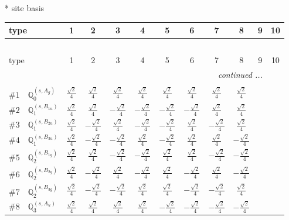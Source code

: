 \documentclass[fleqn,9pt,landscape]{jsarticle}
\begin{document}
* site basis
\begin{center}
\renewcommand{\arraystretch}{1.3}
\begin{longtable}{lcccccccccc}
 \hline \hline
type & 1 & 2 & 3 & 4 & 5 & 6 & 7 & 8 & 9 & 10 \\ \hline \endfirsthead

\multicolumn{10}{l}{\tablename\ \thetable{}} \\
 \hline \hline
type & 1 & 2 & 3 & 4 & 5 & 6 & 7 & 8 & 9 & 10 \\ \hline \endhead

 \hline \hline
\multicolumn{10}{r}{\footnotesize\it continued ...} \\ \endfoot

 \hline \hline
\multicolumn{10}{r}{} \\ \endlastfoot

$ \#1\quad \mathbb{Q}_{0}^{(s,A_{g})} $ & $ \frac{\sqrt{2}}{4} $ & $ \frac{\sqrt{2}}{4} $ & $ \frac{\sqrt{2}}{4} $ & $ \frac{\sqrt{2}}{4} $ & $ \frac{\sqrt{2}}{4} $ & $ \frac{\sqrt{2}}{4} $ & $ \frac{\sqrt{2}}{4} $ & $ \frac{\sqrt{2}}{4} $ \\ \hline
$ \#2\quad \mathbb{Q}_{1}^{(s,B_{1u})} $ & $ \frac{\sqrt{2}}{4} $ & $ \frac{\sqrt{2}}{4} $ & $ - \frac{\sqrt{2}}{4} $ & $ - \frac{\sqrt{2}}{4} $ & $ - \frac{\sqrt{2}}{4} $ & $ - \frac{\sqrt{2}}{4} $ & $ \frac{\sqrt{2}}{4} $ & $ \frac{\sqrt{2}}{4} $ \\ \hline
$ \#3\quad \mathbb{Q}_{1}^{(s,B_{2u})} $ & $ \frac{\sqrt{2}}{4} $ & $ - \frac{\sqrt{2}}{4} $ & $ \frac{\sqrt{2}}{4} $ & $ - \frac{\sqrt{2}}{4} $ & $ - \frac{\sqrt{2}}{4} $ & $ \frac{\sqrt{2}}{4} $ & $ - \frac{\sqrt{2}}{4} $ & $ \frac{\sqrt{2}}{4} $ \\ \hline
$ \#4\quad \mathbb{Q}_{1}^{(s,B_{3u})} $ & $ \frac{\sqrt{2}}{4} $ & $ - \frac{\sqrt{2}}{4} $ & $ - \frac{\sqrt{2}}{4} $ & $ \frac{\sqrt{2}}{4} $ & $ - \frac{\sqrt{2}}{4} $ & $ \frac{\sqrt{2}}{4} $ & $ \frac{\sqrt{2}}{4} $ & $ - \frac{\sqrt{2}}{4} $ \\ \hline
$ \#5\quad \mathbb{Q}_{2}^{(s,B_{1g})} $ & $ \frac{\sqrt{2}}{4} $ & $ \frac{\sqrt{2}}{4} $ & $ - \frac{\sqrt{2}}{4} $ & $ - \frac{\sqrt{2}}{4} $ & $ \frac{\sqrt{2}}{4} $ & $ \frac{\sqrt{2}}{4} $ & $ - \frac{\sqrt{2}}{4} $ & $ - \frac{\sqrt{2}}{4} $ \\ \hline
$ \#6\quad \mathbb{Q}_{2}^{(s,B_{2g})} $ & $ \frac{\sqrt{2}}{4} $ & $ - \frac{\sqrt{2}}{4} $ & $ \frac{\sqrt{2}}{4} $ & $ - \frac{\sqrt{2}}{4} $ & $ \frac{\sqrt{2}}{4} $ & $ - \frac{\sqrt{2}}{4} $ & $ \frac{\sqrt{2}}{4} $ & $ - \frac{\sqrt{2}}{4} $ \\ \hline
$ \#7\quad \mathbb{Q}_{2}^{(s,B_{3g})} $ & $ \frac{\sqrt{2}}{4} $ & $ - \frac{\sqrt{2}}{4} $ & $ - \frac{\sqrt{2}}{4} $ & $ \frac{\sqrt{2}}{4} $ & $ \frac{\sqrt{2}}{4} $ & $ - \frac{\sqrt{2}}{4} $ & $ - \frac{\sqrt{2}}{4} $ & $ \frac{\sqrt{2}}{4} $ \\ \hline
$ \#8\quad \mathbb{Q}_{3}^{(s,A_{u})} $ & $ \frac{\sqrt{2}}{4} $ & $ \frac{\sqrt{2}}{4} $ & $ \frac{\sqrt{2}}{4} $ & $ \frac{\sqrt{2}}{4} $ & $ - \frac{\sqrt{2}}{4} $ & $ - \frac{\sqrt{2}}{4} $ & $ - \frac{\sqrt{2}}{4} $ & $ - \frac{\sqrt{2}}{4} $ \\
\end{longtable}
\end{center}
\end{document}
